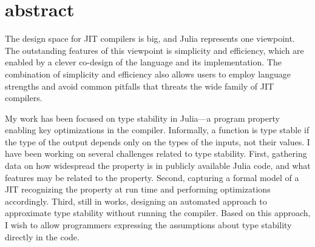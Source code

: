 
\frenchspacing
\raggedbottom

\pagestyle{plain}



\chapter*{abstract}
The design space for JIT compilers is big, and Julia represents one viewpoint.
The outstanding features of this viewpoint is simplicity and efficiency, which
are enabled by a clever co-design of the language and its implementation.
The combination of simplicity and efficiency also allows users to employ
language strengths and avoid common pitfalls that threats the wide family of JIT
compilers.

My work has been focused on type stability in Julia---a program property
enabling key optimizations in the compiler.
Informally, a function is type stable if the type of
the output depends only on the types of the inputs, not their values.
I have been working on several
challenges related to type stability.
First, gathering data on how widespread the
property is in publicly available Julia code, and what features may be related
to the property.
Second, capturing a formal model of a JIT recognizing the
property at run time and performing optimizations accordingly. Third, still in
works, designing an automated approach to approximate type stability without
running the compiler. Based on this approach, I wish to allow programmers expressing
the assumptions about type stability directly in the code.

\pagestyle{scrheadings}
{}
\setcounter{tocdepth}{2} %
\setcounter{secnumdepth}{3} %
\cleardoublepage%
%
\tableofcontents

\cleardoublepage%
%
\listoffigures

\cleardoublepage%
%
\listoftables

\cleardoublepage%
\pagestyle{scrheadings}
